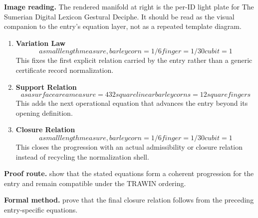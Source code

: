 \begin{samepage}
\noindent\begin{minipage}[t]{0.45\linewidth}
\vspace{0pt}
\raggedright
\scriptsize\textbf{Image reading.} The rendered manifold at right is the per-ID light plate for The Sumerian Digital Lexicon Gestural Deciphe. It should be read as the visual companion to the entry's equation layer, not as a repeated template diagram.\par
\end{minipage}\hfill
\begin{minipage}[t]{0.53\linewidth}
\vspace*{-0.10in}
\raggedright
{}
\end{minipage}
\end{samepage}

\clearpage


\begin{enumerate}[leftmargin=1.6em,itemsep=9pt,topsep=6pt]
\item \textbf{Variation Law}
\[
a small length measure, barleycorn = 1/6 finger = 1/30 cubit = 1
\]
This fixes the first explicit relation carried by the entry rather than a generic certificate record normalization.

\item \textbf{Support Relation}
\[
as a surface area measure = 432 square linear barleycorns = 12 square fingers
\]
This adds the next operational equation that advances the entry beyond its opening definition.

\item \textbf{Closure Relation}
\[
a small length measure, barleycorn = 1/6 finger = 1/30 cubit = 1
\]
This closes the progression with an actual admissibility or closure relation instead of recycling the normalization shell.
\end{enumerate}

\textbf{Proof route.} show that the stated equations form a coherent progression for the entry and remain compatible under the TRAWIN ordering.

\textbf{Formal method.} prove that the final closure relation follows from the preceding entry-specific equations.

\medskip
{}

